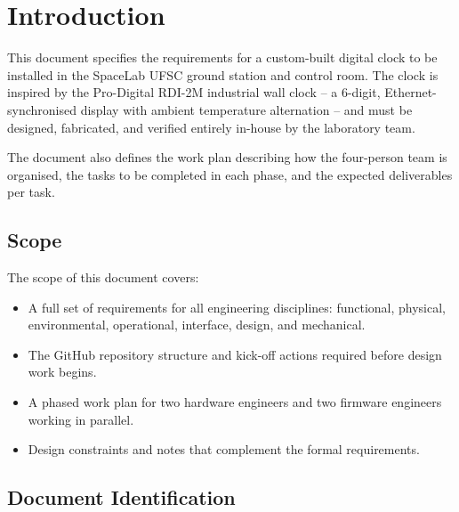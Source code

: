 %
%

\chapter{Introduction} \label{ch:introduction}

This document specifies the requirements for a custom-built digital clock to be installed in the SpaceLab UFSC ground station and control room. The clock is inspired by the Pro-Digital RDI-2M industrial wall clock -- a 6-digit, Ethernet-synchronised display with ambient temperature alternation -- and must be designed, fabricated, and verified entirely in-house by the laboratory team.

The document also defines the work plan describing how the four-person team is organised, the tasks to be completed in each phase, and the expected deliverables per task.

\section{Scope}

The scope of this document covers:

\begin{itemize}
    \item A full set of requirements for all engineering disciplines: functional, physical, environmental, operational, interface, design, and mechanical.
    \item The GitHub repository structure and kick-off actions required before design work begins.
    \item A phased work plan for two hardware engineers and two firmware engineers working in parallel.
    \item Design constraints and notes that complement the formal requirements.
\end{itemize}

\section{Document Identification}


